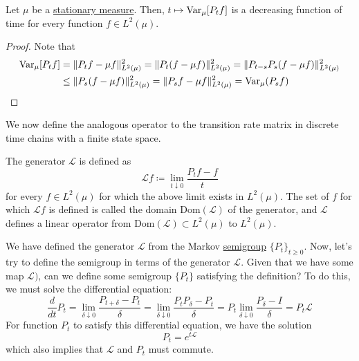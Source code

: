   \begin{lemma}
    \label{thm:variance-decreases-along-the-semigroup}
  Let $\mu$ be a \hyperref[def:stationary-measure]{stationary measure}. Then, $t \mapsto \operatorname{Var}_\mu [P_t f]$ is a decreasing function of time for every function $f \in L^2 (\mu)$. 
  \end{lemma}
  \begin{proof}
  Note that 
  \begin{align*}
      \operatorname{Var}_\mu [P_t f] & = \|P_t f - \mu f\|^2_{L^2(\mu) } =  \|P_t (f - \mu f)\|^2_{L^2 (\mu)} = \|P_{t - s} P_s (f - \mu f)\|^2_{L^2 (\mu)} \\
      & \leq \|P_s (f - \mu f)\|^2_{L^2 (\mu)} = \|P_s f - \mu f\|^2_{L^2 (\mu)} = \operatorname{Var}_\mu (P_s f)
  \end{align*}
  \end{proof}

  We now define the analogous operator to the transition rate matrix in discrete time chains with a finite state space. 

  \begin{definition}[Generator]
    \label{def:generator}
  The generator $\mathscr{L}$ is defined as 
  \begin{equation}
    \mathscr{L} f \coloneqq \lim_{t \downarrow 0} \frac{P_t f - f}{t}
  \end{equation}
  for every $f \in L^2 (\mu)$ for which the above limit exists in $L^2 (\mu)$. The set of $f$ for which $\mathscr{L}f$ is defined is called the domain $\mathrm{Dom}(\mathscr{L})$ of the generator, and $\mathscr{L}$ defines a linear operator from $\mathrm{Dom}(\mathscr{L}) \subset L^2 (\mu)$ to $L^2 (\mu)$. 
  \end{definition}

  We have defined the generator $\mathscr{L}$ from the Markov \hyperref[alg-def:semigroup]{semigroup} $\{P_t\}_{t \geq 0}$. Now, let's try to define the semigroup in terms of the generator $\mathscr{L}$. Given that we have some map $\mathscr{L})$, can we define some semigroup $\{P_t\}$ satisfying the definition? To do this, we must solve the differential equation: 
  \begin{equation}
    \frac{d}{dt} P_t = \lim_{\delta \downarrow 0} \frac{P_{t + \delta} - P_t}{\delta} = \lim_{\delta \downarrow 0} \frac{P_t P_\delta - P_t}{\delta} = P_t \lim_{\delta \downarrow 0} \frac{P_\delta - I}{\delta} = P_t \mathscr{L}
  \end{equation}
  For function $P_t$ to satisfy this differential equation, we have the solution 
  \begin{equation}
    P_t = e^{t \mathscr{L}}
  \end{equation}
  which also implies that $\mathscr{L}$ and $P_t$ must commute. 

